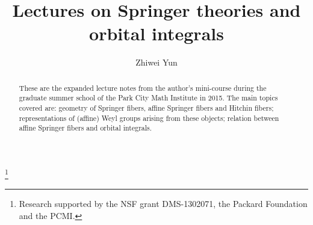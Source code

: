 \documentclass[]{pcmi}
\theoremstyle{plain}
\theoremstyle{definition}
\begin{document}
%
%
%
%
%
%

\title{Lectures on Springer theories and orbital integrals}

%    
%    
\author{Zhiwei Yun}
\thanks{Research supported by the NSF grant DMS-1302071, the Packard Foundation and the PCMI.}
\address{Department of Mathematics, Stanford University, 450 Serra Mall, Building 380, Stanford, CA 94305}
%    
%    

\begin{abstract}
These are the expanded lecture notes from the author's mini-course during the graduate summer school of the Park City Math Institute in 2015. The main topics covered are: geometry of Springer fibers, affine Springer fibers and Hitchin fibers; representations of (affine) Weyl groups arising from these objects; relation between affine Springer fibers and orbital integrals.
\end{abstract}

%    
%    
\maketitle
\end{document}
